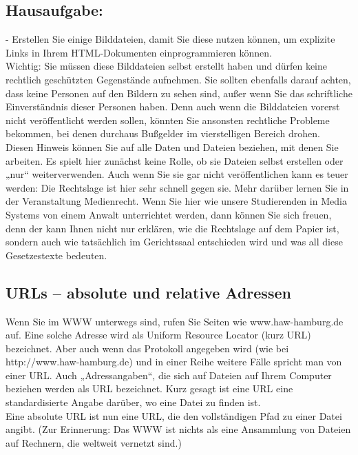 \subsection{Hausaufgabe:}

-	Erstellen Sie einige Bilddateien, damit Sie diese nutzen können, um explizite Links in Ihrem HTML-Dokumenten einprogrammieren können.\\

Wichtig: Sie müssen diese Bilddateien selbst erstellt haben und dürfen keine rechtlich geschützten Gegenstände aufnehmen. Sie sollten ebenfalls darauf achten, dass keine Personen auf den Bildern zu sehen sind, außer wenn Sie das schriftliche Einverständnis dieser Personen haben. Denn auch wenn die Bilddateien vorerst nicht veröffentlicht werden sollen, könnten Sie ansonsten rechtliche Probleme bekommen, bei denen durchaus Bußgelder im vierstelligen Bereich drohen.\\

Diesen Hinweis können Sie auf alle Daten und Dateien beziehen, mit denen Sie arbeiten. Es spielt hier zunächst keine Rolle, ob sie Dateien selbst erstellen oder „nur“ weiterverwenden. Auch wenn Sie sie gar nicht veröffentlichen kann es teuer werden: Die Rechtslage ist hier sehr schnell gegen sie. Mehr darüber lernen Sie in der Veranstaltung Medienrecht. Wenn Sie hier wie unsere Studierenden in Media Systems von einem Anwalt unterrichtet werden, dann können Sie sich freuen, denn der kann Ihnen nicht nur erklären, wie die Rechtslage auf dem Papier ist, sondern auch wie tatsächlich im Gerichtssaal entschieden wird und was all diese Gesetzestexte bedeuten.

\subsection{URLs – absolute und relative Adressen}

Wenn Sie im WWW unterwegs sind, rufen Sie Seiten wie www.haw-hamburg.de auf. Eine solche Adresse wird als Uniform Resource Locator (kurz URL) bezeichnet. Aber auch wenn das Protokoll angegeben wird (wie bei http://www.haw-hamburg.de) und in einer Reihe weitere Fälle spricht man von einer URL. Auch „Adressangaben“, die sich auf Dateien auf Ihrem Computer beziehen werden als URL bezeichnet. Kurz gesagt ist eine URL eine standardisierte Angabe darüber, wo eine Datei zu finden ist.\\

Eine absolute URL ist nun eine URL, die den vollständigen Pfad zu einer Datei angibt. (Zur Erinnerung: Das WWW ist nichts als eine Ansammlung von Dateien auf Rechnern, die weltweit vernetzt sind.) \\

